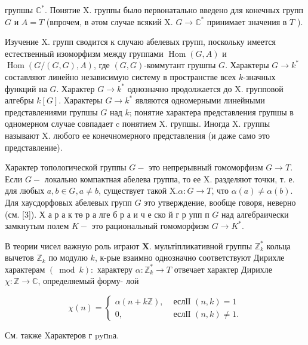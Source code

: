 \documentclass[10pt]{article}
\begin{document}
групшы $\mathbb{C}^{*}$. Понятие X. группы было первонатально введено для конечных групп $G$ и $A=T$ (впрочем, в әтом случае всякий $\mathrm{X}$. $G \longrightarrow \mathbb{C}^{*}$ принимает значения в $T$ ).



Изучение X. групп сводится к случаю абелевых групп, поскольку имеется естественный изоморфизм между группами $\operatorname{Hom}(G, A)$ и $\operatorname{Hom}(G /(G, G), A)$, где $(G, G)$-коммутант грушпы $G$. Характеры $G \rightarrow k^{*}$ составляют линейно независимую систему в пространстве всех $k$-значных функций на $G$. Характер $G \rightarrow k^{*}$ однозначно продолжается до X. групповой алгебры $k[G]$. Характеры $G \longrightarrow k^{*}$ являются одномерными линейными представлениями групшы $G$ над $k$; понятие характера представления групшы в одномерном случае совпадает c понятием X. групшы. Иногда X. группы называют $\mathrm{X}$. любого ее конечномерного представления (и даже само это представление).



Характер топологической группы $G-$ это непрерывный гомоморфизм $G \longrightarrow T$. Если $G-$ локально компактная абелева группа, то ее X. разделяют точки, т. е. для любых $a, b \in G, a \neq b$, существует такой $\mathrm{X} . \alpha: G \longrightarrow T$, что $\alpha(a) \neq \alpha(b)$. Для хаусдорфовых абелевых групп $G$ это утверждение, вообще говоря, неверно (см. [3]). Х а р а к тө р а лге б р а и ч е ско й г р упп п $G$ над алгебраически замкнутым полем $K-$ это рациональный гомоморфизм $G \longrightarrow K^{*}$.



В теории чисел важную роль играют $\mathbf{X}$. мультіпликативной группы $\mathbb{Z}_{k}^{*}$ кольца вычетов $\mathbb{Z}_{k}$ по модулю $k$, к-рые взаимно однозначно соответствуют Дирихле характерам $(\bmod k):$ характеру $\alpha: \mathbb{Z}_{k}^{*} \longrightarrow T$ отвечает характер Дирихле $\chi: \mathbb{Z} \longrightarrow \mathbb{C}$, определяемый форму- лоӥ



\[

\chi(n)= \begin{cases}\alpha(n+k \mathbb{Z}), & \text { еслІІ }(n, k)=1 \\ 0, & \text { еслІІ }(n, k) \neq 1 .\end{cases}

\]



См. также Xарактеров г pyпnа.
\end{document}
